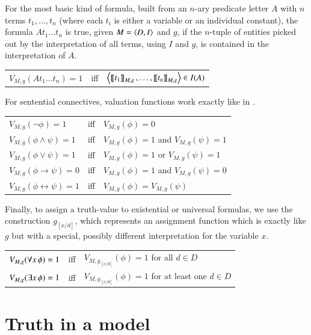 \documentclass[nobib,nofonts]{tufte-handout}
\newcommand{\proplog}{\acro{PropLog}}
\begin{document}
\medskip

For the most basic kind of formula, built from an $n$-ary predicate letter $A$ with $n$ terms $t_{1}, \dots, t_{n}$ (where each $t_{i}$ is either a variable or an individual constant), the formula $At_1\dots t_n$ is true, given $M = \left \langle D, I\right\rangle$ and $g$, if the $n$-tuple of entities picked out by the interpretation of all terms, using $I$ and $g$, is contained in the interpretation of $A$.

\medskip

\begin{tabular}{lcl}
  $V_{M,g}(At_1\dots t_n) =1$ & iff & $\left \langle \left [\! \left [ t_1 \right ]\! \right]_{M,g}, \dots, \left [\! \left [ t_n \right ]\! \right]_{M,g}\right\rangle \in I(A)$
\end{tabular}

\medskip

For sentential connectives, valuation functions work exactly like in \proplog.

\medskip

\begin{tabular}{lcl}
  $V_{M,g}(\neg \phi) = 1$ & iff & $V_{M,g}(\phi) =0$\\
  $V_{M,g}(\phi \wedge \psi) = 1$ & iff & $V_{M,g}(\phi) =1$ and $V_{M,g}(\psi) = 1$\\
  $V_{M,g}(\phi \vee \psi) = 1$ & iff & $V_{M,g}(\phi) =1$ or $V_{M,g}(\psi) = 1$\\
  $V_{M,g}(\phi \rightarrow \psi) = 0$ & iff & $V_{M,g}(\phi) =1$ and $V_{M,g}(\psi) = 0$\\
  $V_{M,g}(\phi \leftrightarrow \psi) = 1$ & iff & $V_{M,g}(\phi) = V_{M,g}(\psi)$
\end{tabular}

\medskip

Finally, to assign a truth-value to existential or universal formulas, we use the construction $g_{[x/d]}$, which represents an assignment function which is exactly like $g$ but with a special, possibly different interpretation for the variable $x$.

\medskip

\begin{tabular}{lcl}
  $V_{M,g}(\forall x \thinspace \phi) = 1$ & iff & $V_{M,g_{[x/d]}}(\phi) = 1$ for all $d \in D$\\
  $V_{M,g}(\exists x \thinspace \phi) = 1$ & iff & $V_{M,g_{[x/d]}}(\phi) = 1$ for at least one $d \in D$
\end{tabular}

\section{Truth in a model}
\end{document}
